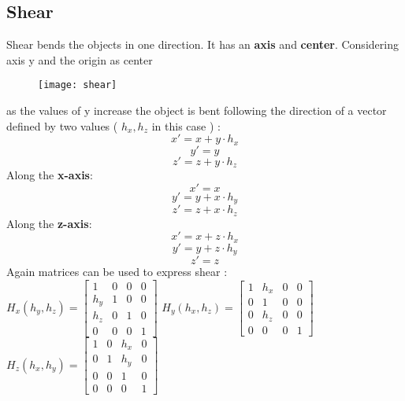 \subsection{Shear}
Shear bends the objects in one direction. It has an \textbf{axis} and \textbf{center}.
Considering axis y and the origin as center
\begin{figure}[H]
\centering
  \texttt{[image: shear]}
 \end{figure}
as the values of y increase the object is bent following the direction of a vector defined by two values ( $h_x,h_z$ in this case ) :
$$ x'= x+y\cdot h_x$$
$$ y'=y$$
$$ z'= z+y\cdot h_z$$
Along the \textbf{x-axis}:
$$ x'= x$$
$$ y'=y+x \cdot h_y$$
$$ z'= z+x\cdot h_z$$
Along the \textbf{z-axis}:
$$ x'= x+z \cdot h_x$$
$$ y'=y+z \cdot h_y$$
$$ z'= z$$
Again matrices can be used to express shear :\\ \hfill
$	
H_x(h_y,h_z)= \begin{bmatrix}
       1 & 0 & 0 & 0        \\[0.1em]
       h_y & 1 & 0 & 0		    \\[0.1em]
       h_z & 0 & 1 & 0							\\[0.1em]
       0 & 0 & 0 & 1
     \end{bmatrix} 
$ $     
H_y(h_x,h_z)= \begin{bmatrix}
       1 & h_x & 0 & 0         \\[0.1em]
       0 & 1 & 0 & 0		    				    \\[0.1em]
       0 & h_z & 0 & 0	    \\[0.1em]
       0 & 0 & 0 & 1
     \end{bmatrix}
$ $    
H_z(h_x,h_y)= \begin{bmatrix}
       1 & 0 & h_x & 0          			    \\[0.1em]
       0 & 1 & h_y & 0		\\[0.1em]
       0 & 0 & 1 & 0			\\[0.1em]
       0 & 0 & 0 & 1
     \end{bmatrix}  
$
